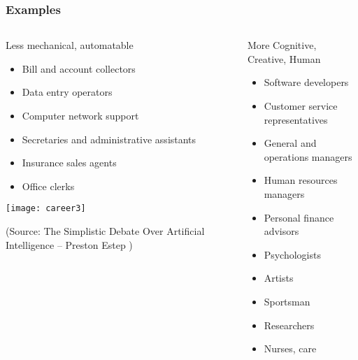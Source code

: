 \begin{frame}[fragile]\frametitle{Examples}
\begin{columns}
    \begin{column}[T]{0.5\linewidth}
		Less mechanical, automatable

      \begin{itemize}
		\item Bill and account collectors
		\item Data entry operators
		\item Computer network support 
		\item Secretaries and administrative assistants
		\item Insurance sales agents
		\item Office clerks

	  \end{itemize}
\begin{center}
\texttt{[image: career3]}
\end{center}

{\tiny (Source: The Simplistic Debate Over Artificial Intelligence – Preston Estep
)}

    \end{column}
    \begin{column}[T]{0.5\linewidth}
		More Cognitive, Creative, Human

      \begin{itemize}
		\item Software developers
		\item Customer service representatives
		\item General and operations managers
		\item Human resources managers
		\item Personal finance advisors
		\item Psychologists
		\item Artists
		\item Sportsman
		\item Researchers
		\item Nurses, care

	  \end{itemize}
    \end{column}
  \end{columns}
\end{frame}


